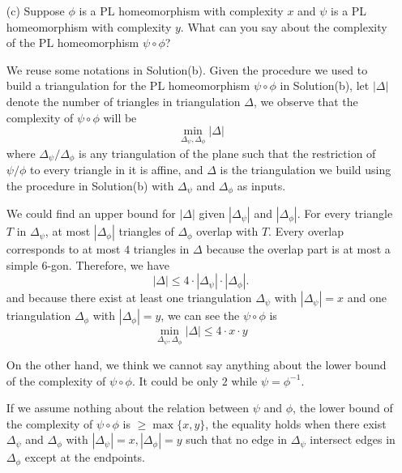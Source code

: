 \documentclass[11pt]{article}
\begin{document}
\begin{enumerate}[(a)]
\begin{solution}
\end{solution}

  \item[(c)]
    Suppose \(\phi\) is a PL homeomorphism with complexity \(x\) and \(\psi\) is a PL
    homeomorphism with complexity \(y\).
    What can you say about the complexity of the PL homeomorphism \(\psi \circ \phi\)?

\begin{solution}
  We reuse some notations in Solution(b).
  Given the procedure we used to build a triangulation for the PL homeomorphism \(\psi\circ \phi\) in Solution(b), let \(|\Delta|\) denote the number of triangles in triangulation \(\Delta\), we observe that the complexity of \(\psi\circ \phi\) will be 
  \[\min_{\Delta_{\psi},\Delta_{\phi}}|\Delta|\]
  where \(\Delta_{\psi}/\Delta_{\phi}\) is any triangulation of the plane such that the restriction of \(\psi/\phi\) to every triangle in it is affine, and \(\Delta\) is the triangulation we build using the procedure in Solution(b) with \(\Delta_{\psi}\) and \(\Delta_{\phi}\) as inputs.

  We could find an upper bound for \(|\Delta|\) given \(|\Delta_{\psi}|\) and \(|\Delta_{\phi}|\).
  For every triangle \(T\) in \(\Delta_{\psi}\), at most \(|\Delta_{\phi}|\) triangles of \(\Delta_{\phi}\) overlap with \(T\). Every overlap corresponds to at most \(4\) triangles in \(\Delta\) because the overlap part is at most a simple \(6\)-gon. Therefore, we have
  \[|\Delta|\le 4\cdot|\Delta_{\psi}|\cdot|\Delta_{\phi}|.\]
  and because there exist at least one triangulation \(\Delta_{\psi}\) with \(|\Delta_{\psi}|=x\) and one triangulation \(\Delta_{\phi}\) with \(|\Delta_{\phi}|=y\), we can see the  \(\psi\circ\phi\) is 
  \[\min_{\Delta_{\psi},\Delta_{\phi}}|\Delta|\le 4\cdot x\cdot y\]

  On the other hand, we think we cannot say anything about the lower bound of the complexity of \(\psi\circ\phi\). It could be only \(2\) while \(\psi=\phi^{-1}\).

  If we assume nothing about the relation between \(\psi\) and \(\phi\), the lower bound of the complexity of \(\psi\circ \phi\) is \(\ge\max\{x,y\}\), the equality holds when there exist \(\Delta_{\psi}\) and \(\Delta_{\phi}\) with \(|\Delta_{\psi}|=x,|\Delta_{\phi}|=y\) such that no edge in \(\Delta_{\psi}\) intersect edges in \(\Delta_{\phi}\) except at the endpoints.
\end{solution}


\end{enumerate}
\end{document}
